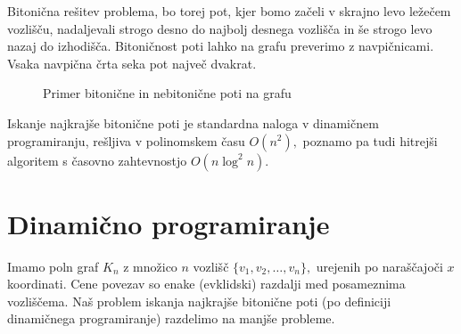 \documentclass[12pt,a4paper]{amsart}
\theoremstyle{definition}
\theoremstyle{plain}
\begin{document}
\noindent
Bitonična rešitev problema, bo torej pot, kjer bomo začeli v skrajno levo ležečem vozlišču, nadaljevali strogo
desno do najbolj desnega vozlišča in še strogo levo nazaj do izhodišča. Bitoničnost poti lahko na grafu 
preverimo z navpičnicami. Vsaka navpična črta seka pot največ dvakrat.


\begin{figure}[!htb]%
    \centering
    \qquad
    \caption{Primer bitonične in nebitonične poti na grafu}%
    \label{fig:example}%
\end{figure}


\noindent
Iskanje najkrajše bitonične poti je standardna naloga v dinamičnem programiranju, rešljiva v polinomskem
času $O(n^2),$ poznamo pa tudi hitrejši algoritem s časovno zahtevnostjo $O(n \log^2 n).$

\section{Dinamično programiranje}

\noindent
Imamo poln graf $K_n$ z množico $n$ vozlišč $\{v_1, v_2, \ldots, v_n\},$ urejenih po naraščajoči $x$ koordinati. 
Cene povezav so enake (evklidski) razdalji med posameznima vozliščema. Naš problem iskanja najkrajše 
bitonične poti (po definiciji dinamičnega programiranje) razdelimo na manjše probleme.
\newline
\end{document}
